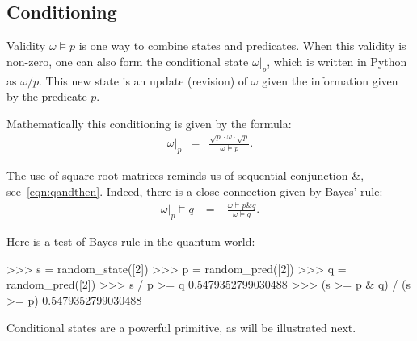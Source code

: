 \documentclass[leqno]{tufte-book} %
\newcommand{\Python}{\textrm{Python}\xspace}
\newcommand{\andthen}{\mathrel{\&}}
\begin{document}
\subsection{Conditioning}\label{subsec:qpred:conditioning}

Validity $\omega\models p$ is one way to combine states and
predicates. When this validity is non-zero, one can also form the
conditional state $\omega|_{p}$,
which is written in \Python as $\omega/p$. This new state is an update
(revision) of $\omega$ given the information given by the predicate
$p$.

Mathematically this conditioning is given by the formula:
\begin{equation}
\label{eqn:qconditiong}
\begin{array}{rcl}
\omega|_{p}
& = &
\displaystyle\frac{\sqrt{p} \cdot \omega \cdot \sqrt{p}}{\omega\models p}.
\end{array}
\end{equation}

\noindent The use of square root matrices reminds us of sequential
conjunction $\andthen$, see~\eqref{eqn:qandthen}. Indeed, there is a
close connection given by Bayes' rule:
\begin{equation}
\label{eqn:qbayes}
\begin{array}{rcl}
\omega|_{p} \models q
& \;=\; &
\displaystyle\frac{\omega\models p\andthen q}{\omega\models q}.
\end{array}
\end{equation}

\noindent Here is a test of Bayes rule in the quantum world:
\begin{python}
>>> s = random_state([2])
>>> p = random_pred([2])
>>> q = random_pred([2])
>>> s / p >= q
0.5479352799030488
>>> (s >= p & q) / (s >= p)
0.5479352799030488
\end{python}

\noindent Conditional states are a powerful primitive, as will
be illustrated next.
\end{document}
